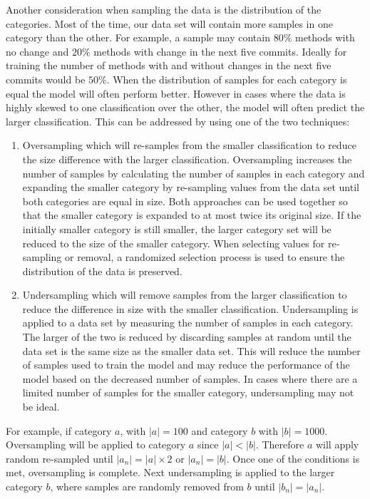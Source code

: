 Another consideration when sampling the data is the distribution of the categories. Most of the time, our data set will contain more samples in one category than the other. For example, a sample may contain $80\%$ methods with no change and $20\%$ methods with change in the next five commits. Ideally for training the number of methods with and without changes in the next five commits would be $50\%$. When the distribution of samples for each category is equal the model will often perform better. %
However in cases where the data is highly skewed to one classification over the other, the model will often predict the larger classification. This can be addressed by using one of the two techniques:
\begin{enumerate} %
\item Oversampling which will re-samples from the smaller classification to reduce the size difference with the larger classification. Oversampling increases the number of samples by calculating the number of samples in each category and expanding the smaller category by re-sampling values from the data set until both categories are equal in size. Both approaches can be used together so that the smaller category is expanded to at most twice its original size. If the initially smaller category is still smaller, the larger category set will be reduced to the size of the smaller category. When selecting values for re-sampling or removal, a randomized selection process is used to ensure the distribution of the data is preserved.
\item Undersampling which will remove samples from the larger classification to reduce the difference in size with the smaller classification. Undersampling is applied to a data set by measuring the number of samples in each category. The larger of the two is reduced by discarding samples at random until the data set is the same size as the smaller data set. This will reduce the number of samples used to train the model and may reduce the performance of the model based on the decreased number of samples. In cases where there are a limited number of samples for the smaller category, undersampling may not be ideal.
\end{enumerate}
For example, if category $a$, with $|a| = 100$ and category $b$ with $|b| = 1000$. Oversampling will be applied to category $a$ since $|a| < |b|$. Therefore $a$ will apply random re-sampled until $|a_n| = |a| \times 2$ or $|a_n| = |b|$. Once one of the conditions is met, oversampling is complete. Next undersampling is applied to the larger category $b$, where samples are randomly removed from $b$ until $|b_n| = |a_n|$.

